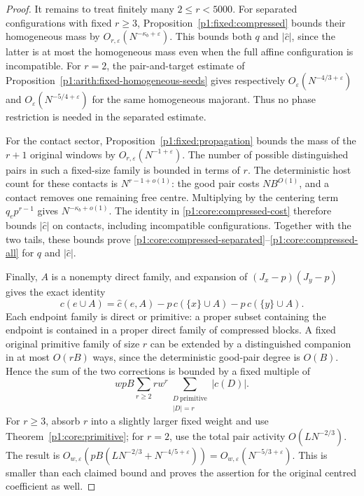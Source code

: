 \begin{proof}
It remains to treat finitely many $2\le r<5000$. For separated
configurations with fixed $r\ge3$,
Proposition~\ref{p1:fixed:compressed} bounds their homogeneous mass by
$O_{r,\varepsilon}(N^{-\kappa_b+\varepsilon})$.
This bounds both $q$ and $|\widehat c|$, since the latter is at most
the homogeneous mass even when the full affine configuration is
incompatible. For $r=2$, the pair-and-target estimate of
Proposition~\ref{p1:arith:fixed-homogeneous-seeds} gives respectively
$O_\varepsilon(N^{-4/3+\varepsilon})$ and
$O_\varepsilon(N^{-5/4+\varepsilon})$ for the same homogeneous
majorant. Thus no phase restriction is needed in the separated estimate.

For the contact sector, Proposition~\ref{p1:fixed:propagation} bounds the
mass of the $r+1$ original windows by $O_{r,\varepsilon}(N^{-1+\varepsilon})$.
The number of possible distinguished pairs in such a fixed-size
family is bounded in terms of $r$. The deterministic host count for
these contacts is $N^{r-1+o(1)}$: the good pair costs $NB^{O(1)}$,
and a contact removes one remaining free centre. Multiplying by the
centering term $q_ep^{r-1}$ gives $N^{-\kappa_b+o(1)}$.
The identity in \eqref{p1:core:compressed-cost} therefore bounds
$|\widehat c|$ on contacts, including incompatible configurations.
Together with the two tails, these bounds prove
\eqref{p1:core:compressed-separated}--\eqref{p1:core:compressed-all}
for $q$ and $|\widehat c|$.

Finally, $A$ is a nonempty direct family, and expansion of
$(J_x-p)(J_y-p)$ gives the exact identity
\begin{equation}
 c(e\cup A)=\widehat c(e,A)
                -p\,c(\{x\}\cup A)-p\,c(\{y\}\cup A).
 \label{p1:core:centering-change}
\end{equation}
Each endpoint family is direct or primitive: a proper subset
containing the endpoint is contained in a proper direct family of
compressed blocks. A fixed original primitive family of size $r$
can be extended by a distinguished companion in at most $O(rB)$ ways,
since the deterministic good-pair degree is $O(B)$. Hence the sum of
the two corrections is bounded by a fixed multiple of
\[
 wpB\sum_{r\ge2}r w^r
             \sum_{\substack{D\ \mathrm{primitive}\\|D|=r}}|c(D)|.
\]
For $r\ge3$, absorb $r$ into a slightly larger fixed weight and use
Theorem~\ref{p1:core:primitive}; for $r=2$, use the total pair activity
$O(LN^{-2/3})$. The result is
$O_{w,\varepsilon}(pB(LN^{-2/3}+N^{-4/5+\varepsilon}))
 =O_{w,\varepsilon}(N^{-5/3+\varepsilon})$.
This is smaller than each claimed bound and proves the assertion for
the original centred coefficient as well.
\end{proof}

